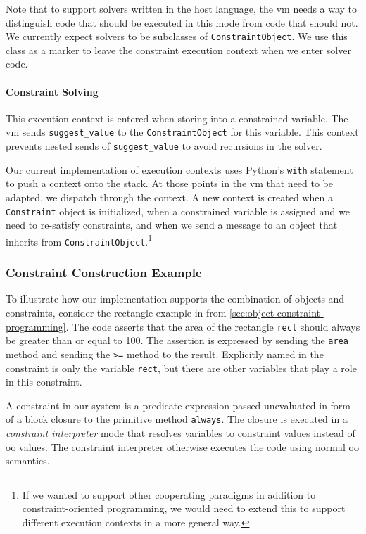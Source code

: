 Note that to support solvers written in the host language, the \ac{vm}
needs a way to distinguish code that should be executed in this mode
from code that should not. We currently expect solvers to be
subclasses of \lstinline{ConstraintObject}. We use this class as a
marker to leave the constraint execution context when we enter solver
code.

\paragraph{Constraint Solving}
This execution context is entered when storing into a constrained
variable.  The \ac{vm} sends \lstinline{suggest_value} to the
\lstinline{ConstraintObject} for this variable. This context prevents
nested sends of \lstinline{suggest_value} to avoid recursions in the
solver.

Our current implementation of execution contexts uses Python's
\lstinline{with} statement to push a context onto the stack. At those
points in the \ac{vm} that need to be adapted, we dispatch through the
context. A new context is created when a \lstinline{Constraint} object
is initialized, when a constrained variable is assigned and we need to
re-satisfy constraints, and when we send a message to an object that
inherits from \lstinline{ConstraintObject}.\footnote{If we wanted to
  support other cooperating paradigms in addition to
  constraint-oriented programming, we would need to extend this to
  support different execution contexts in a more general way.}

\subsubsection*{Constraint Construction Example}
\label{sec:constraint-construction-example}
To illustrate how our implementation supports the combination of
objects and constraints, consider the rectangle example in \langname
from \autoref{sec:object-constraint-programming}.  The code
asserts that the area of the rectangle \lstinline{rect} should always
be greater than or equal to 100. The assertion is expressed by sending the
\lstinline{area} method and sending the \lstinline{>=} method to the
result. Explicitly named in the constraint is only the variable
\lstinline{rect}, but there are other variables that play a role in
this constraint.

A constraint in our system is a predicate expression passed
unevaluated in form of a block closure to the primitive method
\lstinline{always}. The closure is executed in a \emph{constraint
  interpreter} mode that resolves variables to constraint values
instead of \ac{oo} values. The constraint interpreter otherwise
executes the code using normal \ac{oo} semantics.

